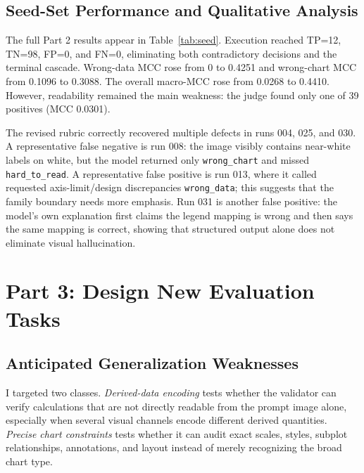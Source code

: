 \documentclass[11pt]{article}
\begin{document}
\subsection{Seed-Set Performance and Qualitative Analysis}
The full Part 2 results appear in Table~\ref{tab:seed}. Execution reached
TP=12, TN=98, FP=0, and FN=0, eliminating both contradictory decisions and the
terminal cascade. Wrong-data MCC rose from 0 to 0.4251 and wrong-chart MCC from
0.1096 to 0.3088. The overall macro-MCC rose from 0.0268 to 0.4410. However,
readability remained the main weakness: the judge found only one of 39
positives (MCC 0.0301).

The revised rubric correctly recovered multiple defects in runs 004, 025, and
030. A representative false negative is run 008: the image visibly contains
near-white labels on white, but the model returned only \texttt{wrong\_chart}
and missed \texttt{hard\_to\_read}. A representative false positive is run
013, where it called requested axis-limit/design discrepancies
\texttt{wrong\_data}; this suggests that the family boundary needs more
emphasis. Run 031 is another false positive: the model's own explanation first
claims the legend mapping is wrong and then says the same mapping is correct,
showing that structured output alone does not eliminate visual hallucination.

\section{Part 3: Design New Evaluation Tasks}

\subsection{Anticipated Generalization Weaknesses}
I targeted two classes. \emph{Derived-data encoding} tests whether the
validator can verify calculations that are not directly readable from the
prompt image alone, especially when several visual channels encode different
derived quantities. \emph{Precise chart constraints} tests whether it can
audit exact scales, styles, subplot relationships, annotations, and layout
instead of merely recognizing the broad chart type.
\end{document}
